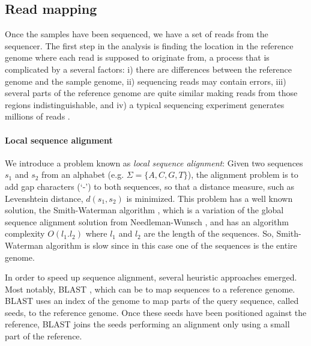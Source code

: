 \subsection{Read mapping}

Once the samples have been sequenced, we have a set of reads from the sequencer. 
The first step in the analysis is finding the location in the reference genome where each read is supposed to originate from, a process that is complicated by a several factors: 
i) there are differences between the reference genome and the sample genome, 
ii) sequencing reads may contain errors, 
iii) several parts of the reference genome are quite similar making reads from those regions indistinguishable, and 
iv) a typical sequencing experiment generates millions of reads \cite{shendure2008next}.

\paragraph{Local sequence alignment} 
We introduce a problem known as \textit{local sequence alignment}: 
Given two sequences $s_1$ and $s_2$ from an alphabet (e.g. $\Sigma = \{A,C,G,T\}$), the alignment problem is to add gap characters (`-') to both sequences, so that a distance measure, such as Levenshtein distance, $d(s_1,s_2)$ is minimized. 
This problem has a well known solution, the Smith-Waterman algorithm \cite{smith1981identification}, which is a variation of the global sequence alignment solution from Needleman-Wunsch \cite{needleman1970general}, and has an algorithm complexity $O(l_1 . l_2)$ where $l_1$ and $l_2$ are the length of the sequences. 
So, Smith-Waterman algorithm is slow since in this case one of the sequences is the entire genome.

In order to speed up sequence alignment, several heuristic approaches emerged. 
Most notably, BLAST \cite{altschul1990basic}, which can be to map sequences to a reference genome. 
BLAST uses an index of the genome to map parts of the query sequence, called seeds, to the reference genome. 
Once these seeds have been positioned against the reference, BLAST joins the seeds performing an alignment only using a small part of the reference.

